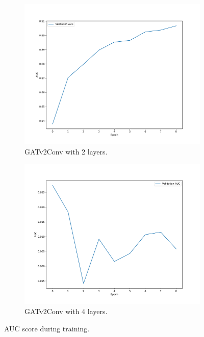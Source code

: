 \documentclass[11pt]{article}
\begin{document}
\begin{figure}
\begin{subfigure}{0.49\textwidth}
  \end{subfigure}
  \begin{subfigure}{0.49\textwidth}
    \centering
    \includegraphics[width=\textwidth]{figures/charts/GAT/auc-layerType_GATv2Conv-numLayers_2.pdf}
    \caption{GATv2Conv with 2 layers.}
    \label{fig:gat2}
  \end{subfigure}
  \begin{subfigure}{0.49\textwidth}
    \centering
    \includegraphics[width=\textwidth]{figures/charts/GAT/auc-layerType_GATv2Conv-numLayers_4.pdf}
    \caption{GATv2Conv with 4 layers.}
    \label{fig:gat4}
  \end{subfigure}
  \caption{AUC score during training.}
  \label{fig:metrics}
\end{figure}
\end{document}
